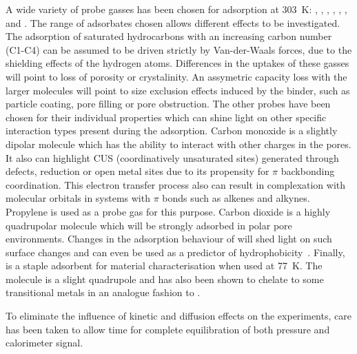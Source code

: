 A wide variety of probe gasses has been chosen for adsorption at \SI{303}{\kelvin}:
, , , , , ,  and .
The range of adsorbates chosen allows different effects to be investigated.
The adsorption of saturated hydrocarbons with an increasing carbon number (C1-C4) can be
assumed to be driven strictly by Van-der-Waals forces, due to the shielding effects 
of the hydrogen atoms. Differences in the uptakes of these gasses will point to 
loss of porosity or crystalinity. An assymetric capacity loss with the larger molecules 
will point to size exclusion effects induced by the binder, such as particle coating,
pore filling or pore obstruction.
The other probes have been chosen for their 
individual properties which can shine light on other specific interaction types 
present during the adsorption. 
Carbon monoxide is a slightly dipolar molecule which has the ability to interact with
other charges in the pores. It also can highlight CUS (coordinatively unsaturated sites)
generated through defects, reduction or open metal sites due to its
propensity for \( \pi \) backbonding coordination.
This electron transfer process also can result in complexation with molecular 
orbitals in systems with \( \pi \) bonds such as alkenes and alkynes. Propylene is used 
as a probe gas for this purpose.
Carbon dioxide is a highly quadrupolar molecule which will be strongly adsorbed in 
polar pore environments. Changes in the adsorption behaviour of  will shed 
light on such surface changes and can even be used as a predictor of 
hydrophobicity~\cite{chanutScreeningEffectWater2017}.
Finally,  is a staple adsorbent for material characterisation when used at
\SI{77}{\kelvin}. The molecule is a slight quadrupole and has also been shown to 
chelate to some transitional metals in an analogue fashion to .

To eliminate the influence of kinetic and diffusion effects on the experiments,
care has been taken to allow time for complete equilibration of both pressure
and calorimeter signal.

